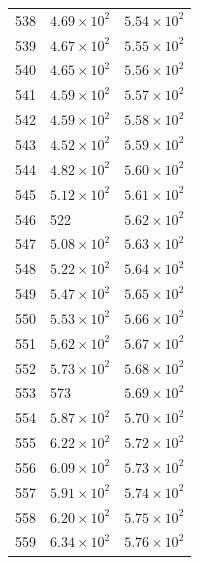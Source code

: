 \begin{table}[H]
\begin{tabular}{lll}
538 & $\displaystyle 4.69 \times 10^{2}$ & $\displaystyle 5.54 \times 10^{2}$ \\
539 & $\displaystyle 4.67 \times 10^{2}$ & $\displaystyle 5.55 \times 10^{2}$ \\
540 & $\displaystyle 4.65 \times 10^{2}$ & $\displaystyle 5.56 \times 10^{2}$ \\
541 & $\displaystyle 4.59 \times 10^{2}$ & $\displaystyle 5.57 \times 10^{2}$ \\
542 & $\displaystyle 4.59 \times 10^{2}$ & $\displaystyle 5.58 \times 10^{2}$ \\
543 & $\displaystyle 4.52 \times 10^{2}$ & $\displaystyle 5.59 \times 10^{2}$ \\
544 & $\displaystyle 4.82 \times 10^{2}$ & $\displaystyle 5.60 \times 10^{2}$ \\
545 & $\displaystyle 5.12 \times 10^{2}$ & $\displaystyle 5.61 \times 10^{2}$ \\
546 & 522 & $\displaystyle 5.62 \times 10^{2}$ \\
547 & $\displaystyle 5.08 \times 10^{2}$ & $\displaystyle 5.63 \times 10^{2}$ \\
548 & $\displaystyle 5.22 \times 10^{2}$ & $\displaystyle 5.64 \times 10^{2}$ \\
549 & $\displaystyle 5.47 \times 10^{2}$ & $\displaystyle 5.65 \times 10^{2}$ \\
550 & $\displaystyle 5.53 \times 10^{2}$ & $\displaystyle 5.66 \times 10^{2}$ \\
551 & $\displaystyle 5.62 \times 10^{2}$ & $\displaystyle 5.67 \times 10^{2}$ \\
552 & $\displaystyle 5.73 \times 10^{2}$ & $\displaystyle 5.68 \times 10^{2}$ \\
553 & 573 & $\displaystyle 5.69 \times 10^{2}$ \\
554 & $\displaystyle 5.87 \times 10^{2}$ & $\displaystyle 5.70 \times 10^{2}$ \\
555 & $\displaystyle 6.22 \times 10^{2}$ & $\displaystyle 5.72 \times 10^{2}$ \\
556 & $\displaystyle 6.09 \times 10^{2}$ & $\displaystyle 5.73 \times 10^{2}$ \\
557 & $\displaystyle 5.91 \times 10^{2}$ & $\displaystyle 5.74 \times 10^{2}$ \\
558 & $\displaystyle 6.20 \times 10^{2}$ & $\displaystyle 5.75 \times 10^{2}$ \\
559 & $\displaystyle 6.34 \times 10^{2}$ & $\displaystyle 5.76 \times 10^{2}$ \\

\end{tabular}
\end{table}
